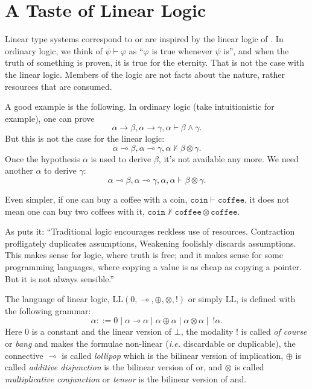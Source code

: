 \section{A Taste of Linear Logic}

Linear type systems correspond to or are inspired by the linear logic of \cite{DBLP:journals/tcs/Girard87}. In ordinary logic, we think of $\psi \vdash \varphi$ as ``$\varphi$ is true whenever $\psi$ is'', and when the truth of something is proven, it is true for the eternity. That is not the case with the linear logic. Members of the logic are not facts about the nature, rather resources that are consumed.

A good example is the following. In ordinary logic (take intuitionistic for example), one can prove
\[
\alpha \rightarrow \beta, \alpha \rightarrow \gamma, \alpha \vdash \beta \wedge \gamma.
\]
But this is not the case for the linear logic:
\[
\alpha \multimap \beta, \alpha \multimap \gamma, \alpha \not\vdash \beta \otimes \gamma.
\]
Once the hypothesis $\alpha$ is used to derive $\beta$, it's not available any more. We need another $\alpha$ to derive $\gamma$:
\[
\alpha \multimap \beta, \alpha \multimap \gamma, \alpha, \alpha \vdash \beta \otimes \gamma.
\]

Even simpler, if one can buy a coffee with a coin, $\mathtt{coin} \vdash \mathtt{coffee}$, it does not mean one can buy two coffees with it, $\mathtt{coin} \not\vdash \mathtt{coffee} \otimes \mathtt{coffee}$.

As \cite{DBLP:conf/mfcs/Wadler93} puts it: ``Traditional logic encourages reckless use of resources. Contraction profligately duplicates assumptions, Weakening foolishly discards assumptions. This makes sense for logic, where truth is free; and it makes sense for some programming languages, where copying a value is as cheap as copying a pointer. But it is not always sensible.''

The language of linear logic, LL$(0, \multimap, \oplus, \otimes, !)$ or simply LL, is defined with the following grammar:
\[
\alpha ::= 0 \mid \alpha \multimap \alpha \mid \alpha \oplus \alpha \mid \alpha \otimes \alpha \mid~ !\alpha.
\]
Here $0$ is a constant and the linear version of $\bot$, the modality $!$ is called \textit{of course} or \textit{bang} and makes the formulae non-linear (\textit{i.e.} discardable or duplicable), the connective $\multimap$ is called \textit{lollipop} which is the bilinear version of implication, $\oplus$ is called \textit{additive disjunction} is the bilinear version of or, and $\otimes$ is called \textit{multiplicative conjunction} or \textit{tensor} is the bilinear version of and.

